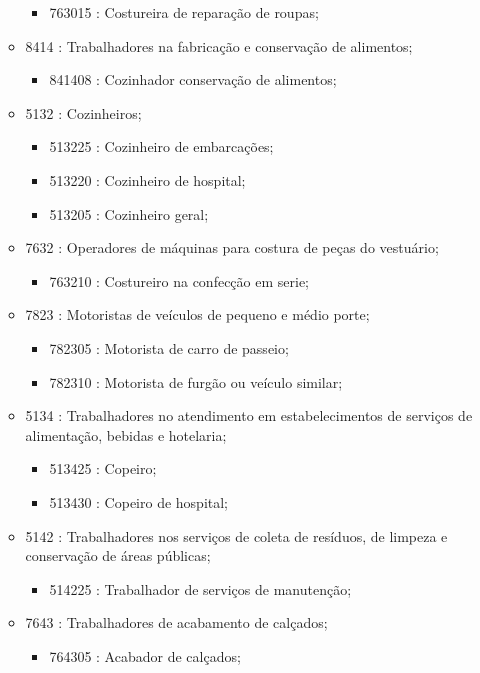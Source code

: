 \begin{itemize}
\begin{itemize}
\begin{itemize}
      \item 763015 : Costureira de reparação de roupas;
    \end{itemize}
    \item 8414 : Trabalhadores na fabricação e conservação de alimentos;
    \begin{itemize}
      \item 841408 : Cozinhador conservação de alimentos;
    \end{itemize}
    \item 5132 : Cozinheiros;
    \begin{itemize}
      \item 513225 : Cozinheiro de embarcações;
      \item 513220 : Cozinheiro de hospital;
      \item 513205 : Cozinheiro geral;
    \end{itemize}
    \item 7632 : Operadores de máquinas para costura de peças do vestuário;
    \begin{itemize}
      \item 763210 : Costureiro na confecção em serie;
    \end{itemize}
    \item 7823 : Motoristas de veículos de pequeno e médio porte;
    \begin{itemize}
      \item 782305 : Motorista de carro de passeio;
      \item 782310 : Motorista de furgão ou veículo similar;
    \end{itemize}
    \item 5134 : Trabalhadores no atendimento em estabelecimentos de serviços de alimentação, bebidas e hotelaria;
    \begin{itemize}
      \item 513425 : Copeiro;
      \item 513430 : Copeiro de hospital;
    \end{itemize}
    \item 5142 : Trabalhadores nos serviços de coleta de resíduos, de limpeza e conservação de áreas públicas;
    \begin{itemize}
      \item 514225 : Trabalhador de serviços de manutenção;
    \end{itemize}
    \item 7643 : Trabalhadores de acabamento de calçados;
    \begin{itemize}
      \item 764305 : Acabador de calçados;
    \end{itemize}
  \end{itemize}
\end{itemize}
